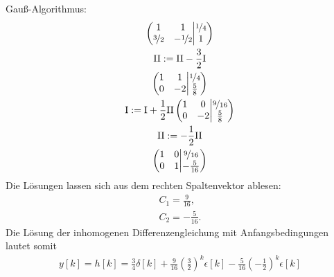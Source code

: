 \documentclass[11pt,a4paper,DIV=12]{scrartcl}
\begin{document}
%
%
Gauß-Algorithmus:
%
%
\begin{gather}
	\left\lparen
	\begin{matrix}
		1 & 1 \\
		\nicefrac{3}{2} & -\nicefrac{1}{2}
	\end{matrix}
	\middle\vert
	\begin{matrix}
		\nicefrac{1}{4}\\
		1
	\end{matrix}
	\right\rparen\\
	\mathrm{II}:=\mathrm{II}-\frac{3}{2}\mathrm{I}\\
	\left\lparen
	\begin{matrix}
		1 & 1 \\
		0 & -2
	\end{matrix}
	\middle\vert
	\begin{matrix}
		\nicefrac{1}{4}\\
		\frac{5}{8}
	\end{matrix}
	\right\rparen\\
	\mathrm{I}:=\mathrm{I}+\frac{1}{2}\mathrm{II}
	\left\lparen
	\begin{matrix}
		1 & 0 \\
		0 & -2
	\end{matrix}
	\middle\vert
	\begin{matrix}
		\nicefrac{9}{16}\\
		\frac{5}{8}
	\end{matrix}
	\right\rparen\\
	\mathrm{II}:=-\frac{1}{2}\mathrm{II}\\
	\left\lparen
	\begin{matrix}
		1 & 0 \\
		0 & 1
	\end{matrix}
	\middle\vert
	\begin{matrix}
		\nicefrac{9}{16}\\
		-\frac{5}{16}
	\end{matrix}
	\right\rparen
\end{gather}
%
%
%
Die Lösungen lassen sich aus dem rechten Spaltenvektor ablesen:
%
\begin{gather}
	C_1=\frac{9}{16},\nonumber \\
	C_2=-\frac{5}{16}.\nonumber
\end{gather}
%
Die Lösung der inhomogenen Differenzengleichung mit Anfangsbedingungen lautet
somit
%
%
\begin{gather}
	y[k]=h[k]=
	\frac{3}{4}\delta[k]+\frac{9}{16}\left(\frac{3}{2}\right)^k\epsilon[k]
	-\frac{5}{16}\left(-\frac{1}{2}\right)^k\epsilon[k]
\end{gather}
\end{document}
